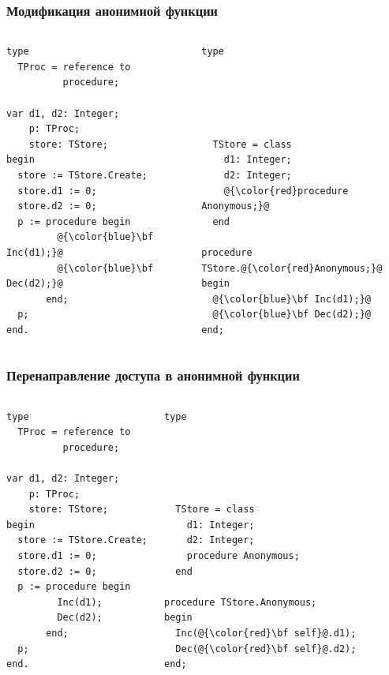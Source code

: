 \documentclass[roman,12pt]{beamer}
\begin{document}
\begin{frame}[fragile]
  \frametitle{Модификация анонимной функции}
  \begin{columns}[c]
    \column{2.2in}
     \begin{lstlisting}[escapechar=@,basicstyle=\scriptsize]
type 
  TProc = reference to
          procedure;

var d1, d2: Integer;
    p: TProc;
    store: TStore;
begin
  store := TStore.Create;
  store.d1 := 0;
  store.d2 := 0;
  p := procedure begin
         @{\color{blue}\bf Inc(d1);}@
         @{\color{blue}\bf Dec(d2);}@
       end;
  p;
end.
     \end{lstlisting}
   \column{2.2in}
     \begin{lstlisting}[escapechar=@,basicstyle=\scriptsize]  
type





  TStore = class
    d1: Integer;
    d2: Integer;
    @{\color{red}procedure Anonymous;}@
  end
  
procedure TStore.@{\color{red}Anonymous;}@
begin
  @{\color{blue}\bf Inc(d1);}@
  @{\color{blue}\bf Dec(d2);}@
end;

     \end{lstlisting}

  \end{columns}
\end{frame}

\begin{frame}[fragile]
  \frametitle{Перенаправление доступа в анонимной функции}
  \begin{columns}[c]
    \column{2.2in}
     \begin{lstlisting}[escapechar=@,basicstyle=\scriptsize]
type 
  TProc = reference to
          procedure;

var d1, d2: Integer;
    p: TProc;
    store: TStore;
begin
  store := TStore.Create;
  store.d1 := 0;
  store.d2 := 0;
  p := procedure begin
         Inc(d1);
         Dec(d2);
       end;
  p;
end.
     \end{lstlisting}
   \column{2.2in}
     \begin{lstlisting}[escapechar=@,basicstyle=\scriptsize]  
type





  TStore = class
    d1: Integer;
    d2: Integer;
    procedure Anonymous;
  end
  
procedure TStore.Anonymous;
begin
  Inc(@{\color{red}\bf self}@.d1);
  Dec(@{\color{red}\bf self}@.d2);
end;

     \end{lstlisting}

  \end{columns}
\end{frame}
\end{document}
